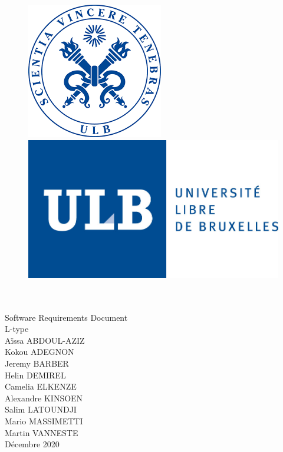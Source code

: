 \documentclass[a4paper,12pt]{article}
\begin{document}
    \begin{titlepage}

        \begin{center}
        
            \begin{figure}[H]
              \begin{minipage}[c]{.46\linewidth}
                    \centering
                    \includegraphics[scale = 0.3]{ulb.png}
                \end{minipage}
                \hfill%
                \begin{minipage}[c]{.46\linewidth}
                    \centering
                    \includegraphics[scale=0.5]{ulb2.jpg}
                \end{minipage}
            \end{figure}
        
            {\\[2 cm] \Huge\\Software Requirements Document \\ 
            L-type\\[4 cm]}
            {Aïssa ABDOUL-AZIZ \\[0,2 cm] Kokou ADEGNON \\[0,2 cm] Jeremy BARBER \\[0,2 cm] Helin DEMIREL \\[0,2 cm] Camelia ELKENZE \\[0,2 cm] Alexandre KINSOEN \\[0,2 cm] Salim LATOUNDJI \\[0,2 cm] Mario MASSIMETTI \\[0,2 cm] Martin VANNESTE \\ [3 cm] Décembre 2020}

        \end{center}

    \end{titlepage}
\end{document}
